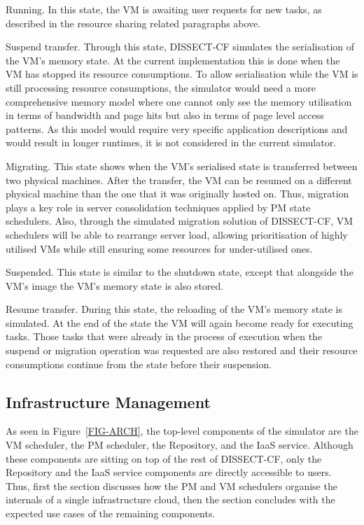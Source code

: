 \documentclass[sort, compress, 5p]{elsarticle}
\begin{document}
\begin{description*}
\item[Running.] In this state, the VM is awaiting user requests for new tasks, as described in the resource sharing related paragraphs above.
\item[Suspend transfer.] Through this state, DISSECT-CF simulates the serialisation of the  VM's memory state. At the current implementation this is done when the VM has stopped its resource consumptions. To allow serialisation while the VM is still processing resource consumptions, the simulator would need a more comprehensive memory model where one cannot only see the memory utilisation in terms of bandwidth and page hits but also in terms of page level access patterns. As this model would require very specific application descriptions and would result in longer runtimes, it is not considered in the current simulator.
\item[Migrating.] This state shows when the VM's serialised state is transferred between two physical machines. After the transfer, the VM can be resumed on a different physical machine than the one that it was originally hosted on. Thus, migration plays a key role in server consolidation techniques applied by PM state schedulers. Also, through the simulated migration solution of DISSECT-CF, VM schedulers will be able to rearrange server load, allowing prioritisation of highly utilised VMs while still ensuring some resources for under-utilised ones.
\item[Suspended.] This state is similar to the shutdown state, except that alongside the VM's image the VM's memory state is also stored.
\item[Resume transfer.] During this state, the reloading of the VM's memory state is simulated. At the end of the state the VM will again become ready for executing tasks. Those tasks that were already in the process of execution when the suspend or migration operation was requested are also restored and their resource consumptions continue from the state before their suspension.
\end{description*}


\subsection{Infrastructure Management} \label{Sec-IM}

As seen in Figure~\ref{FIG-ARCH}, the top-level components of the simulator are the VM scheduler, the PM scheduler, the Repository, and the IaaS service. Although these components are sitting on top of the rest of DISSECT-CF, only the Repository and the IaaS service components are directly accessible to users. Thus, first the section discusses how the PM and VM schedulers organise the internals of a single infrastructure cloud, then the section concludes with the expected use cases of the remaining components.
\end{document}
